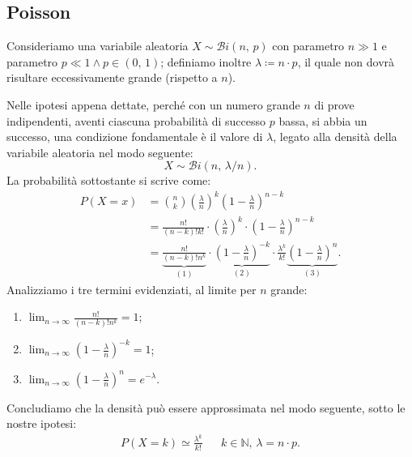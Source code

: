         \subsection{Poisson}
            \begin{defn}
                Consideriamo una variabile aleatoria $X \sim \mathcal{B}i(n,\,p)$ con parametro $n \gg 1$ e parametro  $p \ll 1 \land p \in (0,\, 1)$; definiamo inoltre $\lambda \coloneqq n \cdot p$, il quale non dovrà risultare eccessivamente grande (rispetto a $n$).

                Nelle ipotesi appena dettate, perché con un numero grande $n$ di prove indipendenti, aventi ciascuna probabilità di successo $p$ bassa, si abbia un successo, una condizione fondamentale è il valore di $\lambda$, legato alla densità della variabile aleatoria nel modo seguente: \[
                    X \sim \mathcal{B}i(n,\, \lambda / n)
                .\] La probabilità sottostante si scrive come:
                \begin{align*}
                    P(X = x) &= \binom{n}{k} \left(\frac{\lambda}{n}\right)^k \left(1-\frac{\lambda}{n}\right)^{n-k} \\
                             &= \frac{n!}{(n-k)!k!} \cdot \left(\frac{\lambda}{n}\right)^k \cdot \left(1-\frac{\lambda}{n}\right)^{n-k} \\
                             &= \underset{(1)}{\underbrace{\frac{n!}{(n-k)!n^k}}} \cdot \underset{(2)}{\underbrace{\left(1-\frac{\lambda}{n}\right)^{-k}}} \cdot \frac{\lambda^k}{k!}\underset{(3)}{\underbrace{\left(1-\frac{\lambda}{n}\right)^{n}}}
                .\end{align*}
                Analizziamo i tre termini evidenziati, al limite per $n$ grande:
                \begin{enumerate}
                    \item $\lim_{n \to \infty} \frac{n!}{(n-k)!n^k} = 1$;
                    \item $\lim_{n \to \infty} \left(1-\frac{\lambda}{n}\right)^{-k} = 1$;
                    \item $\lim_{n \to \infty} \left(1-\frac{\lambda}{n}\right)^{n} = e^{-\lambda}$.
                \end{enumerate}
                Concludiamo che la densità può essere approssimata nel modo seguente, sotto le nostre ipotesi:
                \begin{align}\label{eq:Approssimazione_Binomiale_Poisson}
                        P(X = k) \simeq \frac{\lambda^k}{k!} & &k \in \mathbb{N},\, \lambda = n \cdot p
                    .
                \end{align}


\end{defn}

